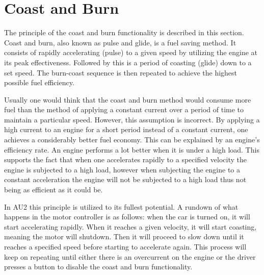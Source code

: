 \section{Coast and Burn}
The principle of the coast and burn functionality is described in this section.
Coast and burn, also known as pulse and glide, is a fuel saving method. It consists of rapidly accelerating (pulse) to a given speed by utilizing the engine at its peak effectiveness. Followed by this is a period of coasting (glide) down to a set speed. The burn-coast sequence is then repeated to achieve the highest possible fuel efficiency.

Usually one would think that the coast and burn method would consume more fuel than the method of applying a constant current over a period of time to maintain a particular speed. However, this assumption is incorrect. By applying a high current to an engine for a short period instead of a constant current, one achieves a considerably better fuel economy. This can be explained by an engine’s efficiency rate. An engine performs a lot better when it is under a high load. This supports the fact that when one accelerates rapidly to a specified velocity the engine is subjected to a high load, however when subjecting the engine to a constant acceleration the engine will not be subjected to a high load thus not being as efficient as it could be.

In AU2 this principle is utilized to its fullest potential. A rundown of what happens in the motor controller is as follows: when the car is turned on, it will start accelerating rapidly. When it reaches a given velocity, it will start coasting, meaning the motor will shutdown. Then it will proceed to slow down until it reaches a specified speed before starting to accelerate again. This process will keep on repeating until either there is an overcurrent on the engine or the driver presses a button to disable the coast and burn functionality.

